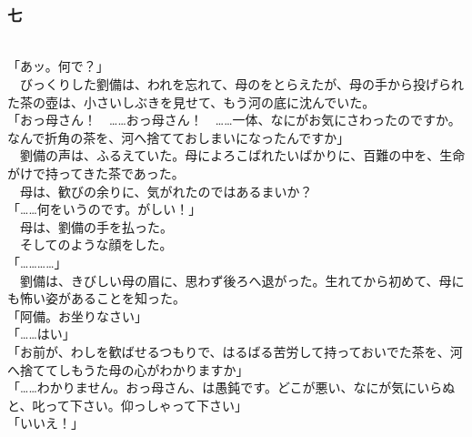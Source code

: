 \documentclass[
  paper=a5,
  fontsize=10pt,
  jafontsize=9.5pt,
  tate,                  %
  open_bracket_pos=nibu, %
]{jlreq}
\begin{document}
\\

\subsubsection{七}

\\


「あッ。何で？」\\


　びっくりした劉備は、われを忘れて、母のをとらえたが、母の手から投げられた茶の壺は、小さいしぶきを見せて、もう河の底に沈んでいた。\\


「おっ母さん！　……おっ母さん！　……一体、なにがお気にさわったのですか。なんで折角の茶を、河へ捨てておしまいになったんですか」\\


　劉備の声は、ふるえていた。母によろこばれたいばかりに、百難の中を、生命がけで持ってきた茶であった。\\


　母は、歓びの余りに、気がれたのではあるまいか？\\


「……何をいうのです。がしい！」\\


　母は、劉備の手を払った。\\


　そしてのような顔をした。\\


「…………」\\


　劉備は、きびしい母の眉に、思わず後ろへ退がった。生れてから初めて、母にも怖い姿があることを知った。\\


「阿備。お坐りなさい」\\


「……はい」\\


「お前が、わしを歓ばせるつもりで、はるばる苦労して持っておいでた茶を、河へ捨ててしもうた母の心がわかりますか」\\


「……わかりません。おっ母さん、は愚鈍です。どこが悪い、なにが気にいらぬと、叱って下さい。仰っしゃって下さい」\\


「いいえ！」\\
\end{document}
